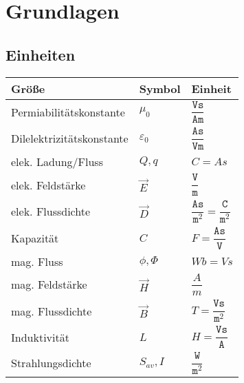 \section{Grundlagen}
\subsection{Einheiten}
\begin{table}[H]
	\renewcommand{\arraystretch}{2.15}
\begin{tabularx}{0.9\columnwidth}{lXl}
	Größe & Symbol & Einheit\\
	\hline
	Permiabilitätskonstante & $\mu_0$ &  $\dfrac{\texttt{Vs}}{\texttt{Am}}$\\
	\hline
	Dilelektrizitätskonstante & $\varepsilon_0$ &  $\dfrac{\texttt{As}}{\texttt{Vm}}$\\
		\hline
	elek. Ladung/Fluss & $ Q, q $ & $ C=As $\\
	\hline
	elek. Feldstärke & $ \vec{E} $ & $\dfrac{\texttt{V}}{\texttt{m}}$\\
	\hline
	elek. Flussdichte & $ \vec{D} $ & $\dfrac{\texttt{As}}{\texttt{m}^2}=\dfrac{\texttt{C}}{\texttt{m}^2}$\\
	\hline
	Kapazität & $C$ &  $F= \dfrac{\texttt{As}}{\texttt{V}}$\\
		\hline
	mag. Fluss& $\phi, \Phi$ &  $Wb = Vs$\\
		\hline
	mag. Feldstärke & $\vec{H}$ &  $\dfrac{A}{m}$\\
		\hline
	mag. Flussdichte & $\vec{B}$ &  $T = \dfrac{\texttt{Vs}}{\texttt{m}^2}$\\
	\hline
	Induktivität & $L$ &  $H = \dfrac{\texttt{Vs}}{\texttt{A}}$\\
		\hline
	Strahlungsdichte & $S_{av}, I$ &  $\dfrac{\texttt{W}}{\texttt{m}^2}$\\
				

\end{tabularx}
\end{table}

